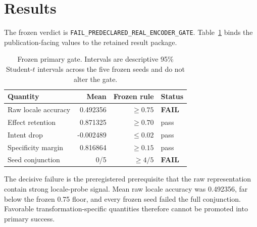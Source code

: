 \documentclass[10pt,twocolumn]{article}
\newcommand{\gatefail}{\textbf{FAIL}}
\newcommand{\gatepass}{pass}
\begin{document}
\section{Results}
The frozen verdict is \nolinkurl{FAIL_PREDECLARED_REAL_ENCODER_GATE}. Table~\ref{tab:primary} binds the publication-facing values to the retained result package.

\begin{table}[t]
\centering
\small
\caption{Frozen primary gate. Intervals are descriptive 95\% Student-$t$ intervals across the five frozen seeds and do not alter the gate.}
\label{tab:primary}
\begin{tabular}{@{}lrrl@{}}
\toprule
Quantity & Mean & Frozen rule & Status \\
\midrule
Raw locale accuracy & 0.492356 & $\geq 0.75$ & \gatefail \\
Effect retention & 0.871325 & $\geq 0.70$ & \gatepass \\
Intent drop & -0.002489 & $\leq 0.02$ & \gatepass \\
Specificity margin & 0.816864 & $\geq 0.15$ & \gatepass \\
Seed conjunction & 0/5 & $\geq 4/5$ & \gatefail \\
\bottomrule
\end{tabular}
\end{table}

The decisive failure is the preregistered prerequisite that the raw representation contain strong locale-probe signal. Mean raw locale accuracy was 0.492356, far below the frozen 0.75 floor, and every frozen seed failed the full conjunction. Favorable transformation-specific quantities therefore cannot be promoted into primary success.
\end{document}
